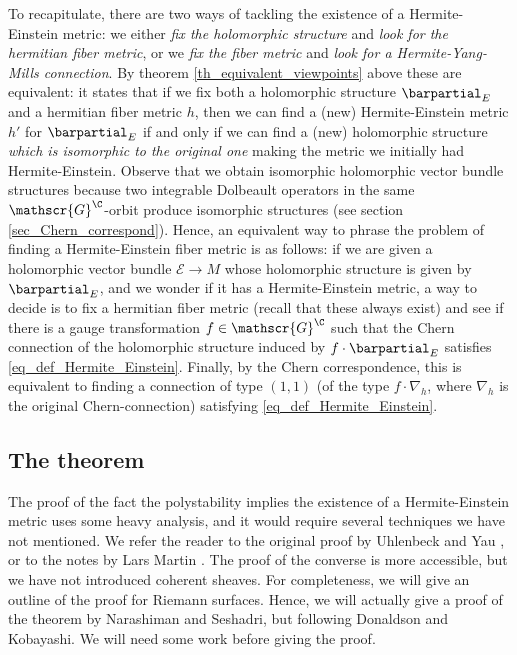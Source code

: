 To recapitulate, there are two ways of tackling the existence of a Hermite-Einstein metric: we either \textit{fix the holomorphic structure} and \textit{look for the hermitian fiber metric}, or we \textit{fix the fiber metric} and \textit{look for a Hermite-Yang-Mills connection}. By theorem \ref{th_equivalent_viewpoints} above these are equivalent: it states that if we fix both a holomorphic structure \(\barpartial_E\) and a hermitian fiber metric \(h\), then we can find a (new) Hermite-Einstein metric \(h'\) for \(\barpartial_E\) if and only if we can find a (new) holomorphic structure \textit{which is isomorphic to the original one} making the metric we initially had Hermite-Einstein. Observe that we obtain isomorphic holomorphic vector bundle structures because two integrable Dolbeault operators in the same \(\mathscr{G}^\C\)-orbit produce isomorphic structures (see section \ref{sec_Chern_correspond}). Hence, an equivalent way to phrase the problem of finding a Hermite-Einstein fiber metric is as follows: if we are given a holomorphic vector bundle \(\mathcal{E} \to M\) whose holomorphic structure is given by \(\barpartial_E\), and we wonder if it has a Hermite-Einstein metric, a way to decide is to fix a hermitian fiber metric (recall that these always exist) and see if there is a gauge transformation \(f \in \mathscr{G}^\C\) such that the Chern connection of the holomorphic structure induced by \(f \cdot \barpartial_E\) satisfies \eqref{eq_def_Hermite_Einstein}. Finally, by the Chern correspondence, this is equivalent to finding a connection of type \((1,1)\) (of the type \(f \cdot \nabla_h\), where \(\nabla_h\) is the original Chern-connection) satisfying \eqref{eq_def_Hermite_Einstein}.

\subsection{The theorem}

The proof of the fact the polystability implies the existence of a Hermite-Einstein metric uses some heavy analysis, and it would require several techniques we have not mentioned. We refer the reader to the original proof by Uhlenbeck and Yau \parencite{uhlenbeck_Yau_HK}, or to the notes by Lars Martin \parencite{LarsMartin_Notes_HK}. The proof of the converse is more accessible, but we have not introduced coherent sheaves. For completeness, we will give an outline of the proof for Riemann surfaces. Hence, we will actually give a proof of the theorem by Narashiman and Seshadri, but following Donaldson and Kobayashi. We will need some work before giving the proof. \\


